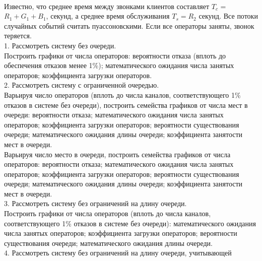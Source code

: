 \documentclass{article}
\begin{document}
\noindent\textbf {} 
\vspace{\baselineskip}
\\
\large Известно, что среднее время между звонками клиентов составляет \begin{math}T_c\end{math} =
\begin{math}R_1 + G_1 + B_1\end{math}, секунд, а среднее время обслуживания \begin{math}T_s = R_2\end{math} секунд. Все потоки
случайных событий считать пуассоновскими. Если все операторы заняты,
звонок теряется.
\vspace{\baselineskip}
\\
1. Рассмотреть систему без очереди. \\Построить графики от числа операторов:
вероятности отказа (вплоть до обеспечения отказов менее 1\%);
математического ожидания числа занятых операторов; коэффициента загрузки
операторов.
\vspace{\baselineskip}
\\
2. Рассмотреть систему с ограниченной очередью. \\Варьируя число операторов
(вплоть до числа каналов, соответствующего 1\% отказов в системе без
очереди), построить семейства графиков от числа мест в очереди: вероятности
отказа; математического ожидания числа занятых операторов; коэффициента
загрузки операторов; вероятности существования очереди; математического
ожидания длины очереди; коэффициента занятости мест в очереди. \\Варьируя
число место в очереди, построить семейства графиков от числа операторов:
вероятности отказа; математического ожидания числа занятых операторов;
коэффициента загрузки операторов; вероятности существования очереди;
математического ожидания длины очереди; коэффициента занятости мест в
очереди.
\vspace{\baselineskip}
\\
3. Рассмотреть систему без ограничений на длину очереди. \\Построить графики
от числа операторов (вплоть до числа каналов, соответствующего 1\% отказов в
системе без очереди): математического ожидания числа занятых операторов;
коэффициента загрузки операторов; вероятности существования очереди;
математического ожидания длины очереди.
\vspace{\baselineskip}
\\
4. Рассмотреть систему без ограничений на длину очереди, учитывающей
\end{document}
